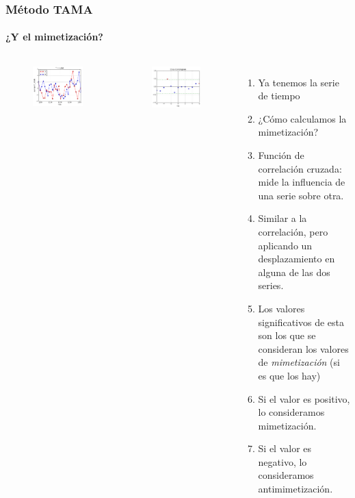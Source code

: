 \begin{frame}
  \frametitle{Método TAMA}
  \framesubtitle{¿Y el mimetización?}
  \begin{columns}
  \begin{figure}[t]
    \includegraphics[scale=0.28]{images/time_plot.png}
  \end{figure}
  \begin{figure}[t]
    \includegraphics[scale=0.28]{images/cross_correlogram.png}
  \end{figure}
  \begin{enumerate}
    \item Ya tenemos la serie de tiempo
    \item ¿Cómo calculamos la mimetización?
    \item Función de correlación cruzada: mide la influencia de una serie sobre otra.
    \item Similar a la correlación, pero aplicando un desplazamiento en alguna de las dos series.
    \item Los valores significativos de esta son los que se consideran los valores de \emph{mimetización} (si es que los hay)
    \item Si el valor es positivo, lo consideramos mimetización.
    \item Si el valor es negativo, lo consideramos antimimetización.
  \end{enumerate}

  \end{columns}
\end{frame}


